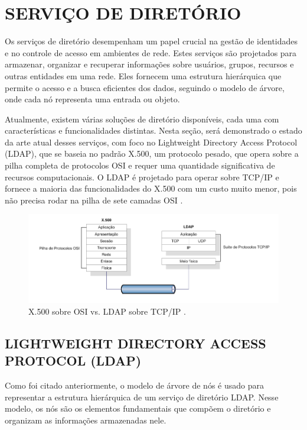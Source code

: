 \newpage

\section{SERVIÇO DE DIRETÓRIO}
\label{sec:referencial-teórico}
Os serviços de diretório desempenham um papel crucial na gestão de identidades e no controle de acesso em ambientes de rede. Estes serviços são projetados para armazenar, organizar e recuperar informações sobre usuários, grupos, recursos e outras entidades em uma rede. Eles fornecem uma estrutura hierárquica que permite o acesso e a busca eficientes dos dados, seguindo o modelo de árvore, onde cada nó representa uma entrada ou objeto.

Atualmente, existem várias soluções de diretório disponíveis, cada uma com características e funcionalidades distintas. Nesta seção, será demonstrado o estado da arte atual desses serviços, com foco no Lightweight Directory Access Protocol (LDAP), que se baseia no padrão X.500, um protocolo pesado, que opera sobre a pilha completa de protocolos OSI e requer uma quantidade significativa de recursos computacionais. O LDAP é projetado para operar sobre TCP/IP e fornece a maioria das funcionalidades do X.500 com um custo muito menor, pois não precisa rodar na pilha de sete camadas OSI \cite{machado2020}.

\begin{figure}[h]
    \centering
	\includegraphics[scale=0.6]{projeto/textuais/CamadasX.500LDAP.png}
	\caption[X.500 sobre OSI vs. LDAP sobre TCP/IP-]{X.500 sobre OSI vs. LDAP sobre TCP/IP \cite{machado2020}.
	\label{fig:camadaX.500Ldap}}
\end{figure}

\subsection{LIGHTWEIGHT DIRECTORY ACCESS PROTOCOL (LDAP)}

Como foi citado anteriormente, o modelo de árvore de nós é usado para representar a estrutura hierárquica de um serviço de diretório LDAP. Nesse modelo, os nós são os elementos fundamentais que compõem o diretório e organizam as informações armazenadas nele.

